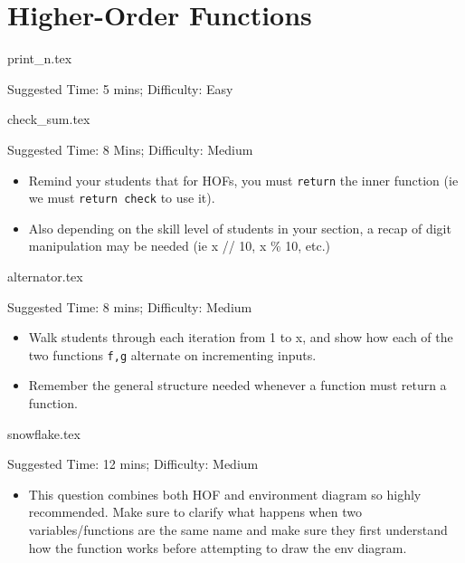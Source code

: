 \documentclass{exam}
\begin{document}
\section{Higher-Order Functions}
\begin{questions}
    
    {print_n.tex}
    \begin{questionmeta}
        Suggested Time: 5 mins; Difficulty: Easy
    \end{questionmeta}

    {check_sum.tex}
    \begin{questionmeta}
        Suggested Time: 8 Mins; Difficulty: Medium
        \begin{itemize}
            \item Remind your students that for HOFs, you must \lstinline{return} the inner function (ie we must \lstinline{return check} to use it).
            \item Also depending on the skill level of students in your section, a recap of digit manipulation may be needed (ie x // 10, x \% 10, etc.)
        \end{itemize}
    \end{questionmeta}

    {alternator.tex}
    \begin{questionmeta}
        Suggested Time: 8 mins; Difficulty: Medium
        \begin{itemize}
            \item Walk students through each iteration from 1 to x, and show how each of the two functions \verb|f,g| alternate on incrementing inputs.
            \item Remember the general structure needed whenever a function must return a function.
        \end{itemize}
    \end{questionmeta}

    {snowflake.tex}
    \begin{questionmeta}
        Suggested Time: 12 mins; Difficulty: Medium
        \begin{itemize}
        \item This question combines both HOF and environment diagram so highly recommended. Make sure to clarify what happens when two variables/functions are the same name and make sure they first understand how the function works before attempting to draw the env diagram.  
        \end{itemize}
    \end{questionmeta}


\end{questions}
\end{document}
